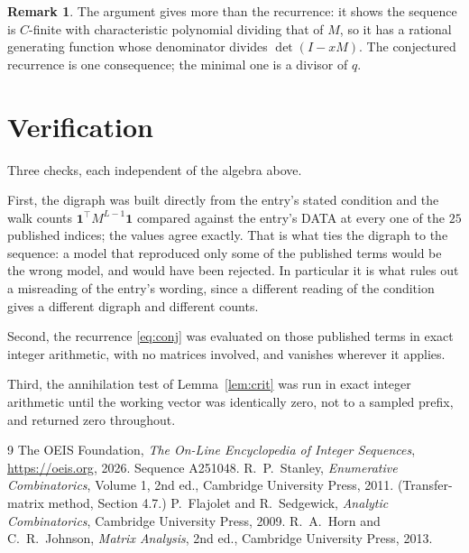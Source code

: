 \documentclass[11pt,a4paper]{article}
\theoremstyle{plain}
\theoremstyle{definition}
\newtheorem{remark}[theorem]{Remark}
\begin{document}
\begin{remark}
The argument gives more than the recurrence: it shows the sequence is $C$-finite with
characteristic polynomial dividing that of $M$, so it has a rational generating function
whose denominator divides $\det(I-xM)$. The conjectured recurrence is one consequence; the
minimal one is a divisor of $q$.
\end{remark}

\section{Verification}

Three checks, each independent of the algebra above.

First, the digraph was built directly from the entry's stated condition and the walk counts
$\mathbf{1}^{\!\top}M^{L-1}\mathbf{1}$ compared against the entry's DATA at
every one of the $25$ published indices; the values agree exactly. That is what ties
the digraph to the sequence: a model that reproduced only some of the published terms would
be the wrong model, and would have been rejected. In particular it is what rules out a
misreading of the entry's wording, since a different reading of the condition gives a
different digraph and different counts.

Second, the recurrence \eqref{eq:conj} was evaluated on those published terms in exact
integer arithmetic, with no matrices involved, and vanishes wherever it applies.

Third, the annihilation test of Lemma~\ref{lem:crit} was run in exact integer arithmetic
until the working vector was identically zero, not to a sampled prefix, and returned zero
throughout.

\begin{thebibliography}{9}
 The OEIS Foundation, \emph{The On-Line Encyclopedia of Integer
Sequences}, \url{https://oeis.org}, 2026. Sequence A251048.
 R.~P.~Stanley, \emph{Enumerative Combinatorics}, Volume 1, 2nd ed.,
Cambridge University Press, 2011. (Transfer-matrix method, Section 4.7.)
 P.~Flajolet and R.~Sedgewick, \emph{Analytic Combinatorics}, Cambridge
University Press, 2009.
 R.~A.~Horn and C.~R.~Johnson, \emph{Matrix Analysis}, 2nd ed., Cambridge
University Press, 2013.
\end{thebibliography}
\end{document}
